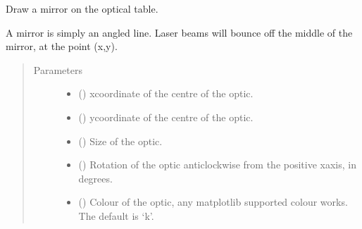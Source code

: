 \documentclass[letterpaper,10pt,english]{sphinxmanual}
\begin{document}
\begin{fulllineitems}
\begin{fulllineitems}
\label{\detokenize{index:pyopticaltable.OpticalTable.mirror}}
\sphinxAtStartPar
Draw a mirror on the optical table.

\sphinxAtStartPar
A mirror is simply an angled line. Laser beams will bounce off the
middle of the mirror, at the point (x,y).
\begin{quote}\begin{description}
\item[{Parameters}] \leavevmode\begin{itemize}
\item {} 
\sphinxAtStartPar
{} () \textendash{} x\sphinxhyphen{}coordinate of the centre of the optic.

\item {} 
\sphinxAtStartPar
{} () \textendash{} y\sphinxhyphen{}coordinate of the centre of the optic.

\item {} 
\sphinxAtStartPar
{} () \textendash{} Size of the optic.

\item {} 
\sphinxAtStartPar
{} () \textendash{} Rotation of the optic anticlockwise from the positive x\sphinxhyphen{}axis, in degrees.

\item {} 
\sphinxAtStartPar
{} (\sphinxstyleliteralemphasis{\sphinxupquote{, }}) \textendash{} Colour of the optic, any matplotlib supported colour works. The default is ‘k’.


\end{itemize}
\end{description}
\end{quote}
\end{fulllineitems}
\end{fulllineitems}
\end{document}
